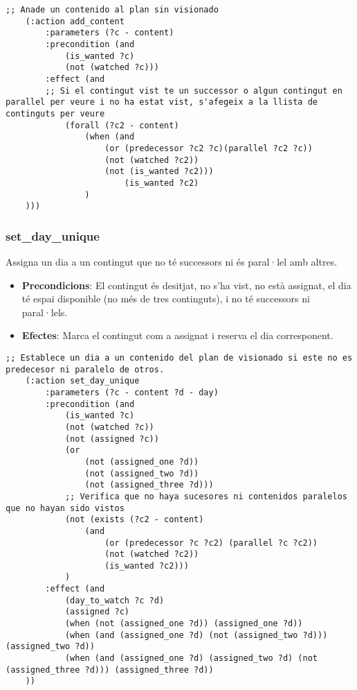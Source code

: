 \documentclass[a4paper]{article}
\begin{document}
	\begin{lstlisting}[language=PDDL, caption={Acció add\_content}, label={lst:add_content}]
	;; Anade un contenido al plan sin visionado
	(:action add_content
		:parameters (?c - content)
		:precondition (and 
			(is_wanted ?c)
			(not (watched ?c)))
		:effect (and 
		;; Si el contingut vist te un successor o algun contingut en parallel per veure i no ha estat vist, s'afegeix a la llista de continguts per veure
			(forall (?c2 - content)
				(when (and 
					(or (predecessor ?c2 ?c)(parallel ?c2 ?c))
					(not (watched ?c2))
					(not (is_wanted ?c2)))
						(is_wanted ?c2)
				)		
	)))
	\end{lstlisting}
	
	\subsubsection*{set\_day\_unique}
	
	Assigna un dia a un contingut que no té successors ni és paral·lel amb altres.
	
	\begin{itemize}
		\item \textbf{Precondicions}: El contingut és desitjat, no s'ha vist, no està assignat, el dia té espai disponible (no més de tres continguts), i no té successors ni paral·lels.
		\item \textbf{Efectes}: Marca el contingut com a assignat i reserva el dia corresponent.
	\end{itemize}
	
	\begin{lstlisting}[language=PDDL, caption={Acció set\_day\_unique}, label={lst:set_day_unique}]
	;; Establece un dia a un contenido del plan de visionado si este no es predecesor ni paralelo de otros.
 	(:action set_day_unique
		:parameters (?c - content ?d - day)
		:precondition (and 
			(is_wanted ?c)
			(not (watched ?c))
			(not (assigned ?c))
			(or 
				(not (assigned_one ?d))
				(not (assigned_two ?d))
				(not (assigned_three ?d)))
			;; Verifica que no haya sucesores ni contenidos paralelos que no hayan sido vistos
			(not (exists (?c2 - content)         
				(and 
					(or (predecessor ?c ?c2) (parallel ?c ?c2))
					(not (watched ?c2))
					(is_wanted ?c2)))
			)
		:effect (and 
			(day_to_watch ?c ?d)
			(assigned ?c)
			(when (not (assigned_one ?d)) (assigned_one ?d))
			(when (and (assigned_one ?d) (not (assigned_two ?d))) (assigned_two ?d))
			(when (and (assigned_one ?d) (assigned_two ?d) (not (assigned_three ?d))) (assigned_three ?d))
	))
	\end{lstlisting}
	
\end{document}

